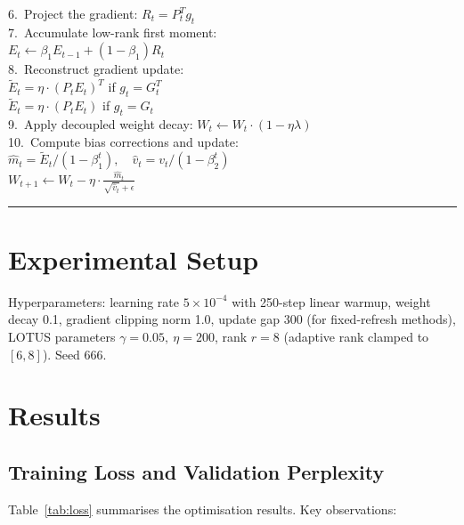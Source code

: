 \documentclass[conference]{IEEEtran}
\begin{document}
{{\begin{minipage}{\columnwidth}
\begin{tabbing}
    6.\ Project the gradient: $R_t = P_t^T g_t$ \\
    7.\ Accumulate low-rank first moment: \\
    \> $E_t \leftarrow \beta_1 E_{t-1} + (1-\beta_1) R_t$ \\
    8.\ Reconstruct gradient update: \\
    \> $\widetilde{E}_t = \eta \cdot (P_t E_t)^T$ \quad \= { if} $g_t = G_t^T$ \\
    \> $\widetilde{E}_t = \eta \cdot (P_t E_t)$ \> { if} $g_t = G_t$ \\
    9.\ Apply decoupled weight decay: $W_t \leftarrow W_t \cdot (1 - \eta \lambda)$ \\
    10.\ Compute bias corrections and update: \\
    \> $\hat{m}_t = \widetilde{E}_t / (1 - \beta_1^t), \quad \hat{v}_t = v_t / (1 - \beta_2^t)$ \\
    \> $W_{t+1} \leftarrow W_t - \eta \cdot \frac{\hat{m}_t}{\sqrt{\hat{v}_t} + \epsilon}$
\end{tabbing}
\end{minipage}%
}
}
\noindent\rule[10pt]{0.8\columnwidth}{0.4pt}

\section{Experimental Setup}
\label{sec:experimental-setup}

Hyperparameters: learning rate \(5\times10^{-4}\) with 250-step linear warmup, weight decay 0.1, gradient clipping norm 1.0, update gap 300 (for fixed-refresh methods), LOTUS parameters \(\gamma=0.05,\ \eta=200\), rank \(r=8\) (adaptive rank clamped to \([6,8]\)). Seed 666.

\section{Results}

\subsection{Training Loss and Validation Perplexity}

Table~\ref{tab:loss} summarises the optimisation results. Key observations:
\end{document}
